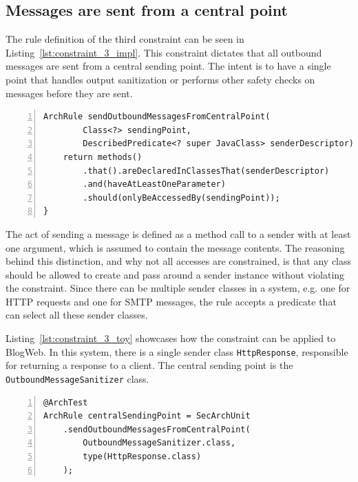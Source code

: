 \subsection{Messages are sent from a central point}
The rule definition of the third constraint can be seen in Listing~\ref{lst:constraint_3_impl}.
This constraint dictates that all outbound messages are sent from a central sending point. The intent is to have a single point that handles output sanitization or performs other safety checks on messages before they are sent. 

\begin{minipage}{\linewidth}
\begin{lstlisting}[caption={Rule definition for constraint 3.}, captionpos=b, label=lst:constraint_3_impl, numbers=left]
ArchRule sendOutboundMessagesFromCentralPoint(
        Class<?> sendingPoint,
        DescribedPredicate<? super JavaClass> senderDescriptor) {
    return methods()
        .that().areDeclaredInClassesThat(senderDescriptor)
        .and(haveAtLeastOneParameter)
        .should(onlyBeAccessedBy(sendingPoint));
}
\end{lstlisting}
\end{minipage}

The act of sending a message is defined as a method call to a sender with at least one argument, which is assumed to contain the message contents. The reasoning behind this distinction, and why not all accesses are constrained, is that any class should be allowed to create and pass around a sender instance without violating the constraint.
Since there can be multiple sender classes in a system, e.g. one for HTTP requests and one for SMTP messages, the rule accepts a predicate that can select all these sender classes.

Listing~\ref{lst:constraint_3_toy} showcases how the constraint can be applied to BlogWeb. In this system, there is a single sender class \texttt{HttpResponse}, responsible for returning a response to a client. The central sending point is the \texttt{OutboundMessageSanitizer} class. 

\begin{minipage}{\linewidth}
\begin{lstlisting}[caption={Application of constraint 3 to BlogWeb.}, captionpos=b, label=lst:constraint_3_toy, numbers=left]
@ArchTest
ArchRule centralSendingPoint = SecArchUnit
    .sendOutboundMessagesFromCentralPoint(
        OutboundMessageSanitizer.class,
        type(HttpResponse.class)
    );
\end{lstlisting}
\end{minipage}




